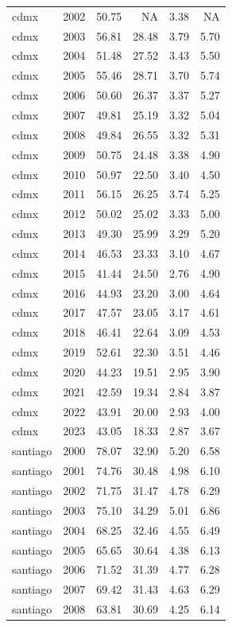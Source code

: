 \begin{table}[!htbp]
\begin{tabular}{ll
rrrr
}
cdmx & 2002 & 50.75 &  NA & 3.38 &  NA \\
cdmx & 2003 & 56.81 & 28.48 & 3.79 & 5.70 \\
cdmx & 2004 & 51.48 & 27.52 & 3.43 & 5.50 \\
cdmx & 2005 & 55.46 & 28.71 & 3.70 & 5.74 \\
cdmx & 2006 & 50.60 & 26.37 & 3.37 & 5.27 \\
cdmx & 2007 & 49.81 & 25.19 & 3.32 & 5.04 \\
cdmx & 2008 & 49.84 & 26.55 & 3.32 & 5.31 \\
cdmx & 2009 & 50.75 & 24.48 & 3.38 & 4.90 \\
cdmx & 2010 & 50.97 & 22.50 & 3.40 & 4.50 \\
cdmx & 2011 & 56.15 & 26.25 & 3.74 & 5.25 \\
cdmx & 2012 & 50.02 & 25.02 & 3.33 & 5.00 \\
cdmx & 2013 & 49.30 & 25.99 & 3.29 & 5.20 \\
cdmx & 2014 & 46.53 & 23.33 & 3.10 & 4.67 \\
cdmx & 2015 & 41.44 & 24.50 & 2.76 & 4.90 \\
cdmx & 2016 & 44.93 & 23.20 & 3.00 & 4.64 \\
cdmx & 2017 & 47.57 & 23.05 & 3.17 & 4.61 \\
cdmx & 2018 & 46.41 & 22.64 & 3.09 & 4.53 \\
cdmx & 2019 & 52.61 & 22.30 & 3.51 & 4.46 \\
cdmx & 2020 & 44.23 & 19.51 & 2.95 & 3.90 \\
cdmx & 2021 & 42.59 & 19.34 & 2.84 & 3.87 \\
cdmx & 2022 & 43.91 & 20.00 & 2.93 & 4.00 \\
cdmx & 2023 & 43.05 & 18.33 & 2.87 & 3.67 \\
santiago & 2000 & 78.07 & 32.90 & 5.20 & 6.58 \\
santiago & 2001 & 74.76 & 30.48 & 4.98 & 6.10 \\
santiago & 2002 & 71.75 & 31.47 & 4.78 & 6.29 \\
santiago & 2003 & 75.10 & 34.29 & 5.01 & 6.86 \\
santiago & 2004 & 68.25 & 32.46 & 4.55 & 6.49 \\
santiago & 2005 & 65.65 & 30.64 & 4.38 & 6.13 \\
santiago & 2006 & 71.52 & 31.39 & 4.77 & 6.28 \\
santiago & 2007 & 69.42 & 31.43 & 4.63 & 6.29 \\
santiago & 2008 & 63.81 & 30.69 & 4.25 & 6.14 \\

\end{tabular}
\end{table}
